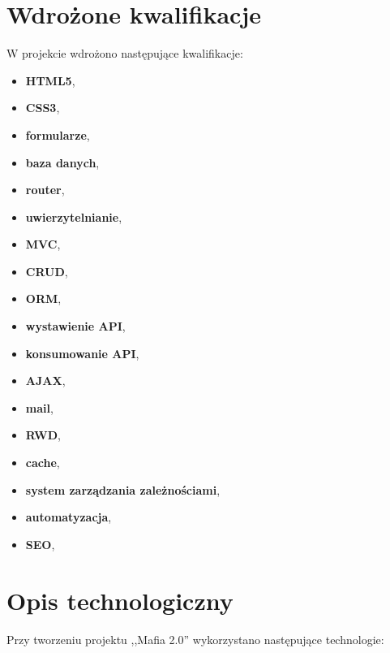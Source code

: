 \documentclass[12pt,a4paper]{article}
\begin{document}
	\section{Wdrożone kwalifikacje}	
		\indent W projekcie wdrożono następujące kwalifikacje:
		\begin{itemize}
			\item \textbf{HTML5},
			\item \textbf{CSS3},
			\item \textbf{formularze},
			\item \textbf{baza danych},
			\item \textbf{router},
			\item \textbf{uwierzytelnianie},
			\item \textbf{MVC},
			\item \textbf{CRUD},
			\item \textbf{ORM}, 
			\item \textbf{wystawienie API},
			\item \textbf{konsumowanie API},
			\item \textbf{AJAX}, 
			\item \textbf{mail},
			\item \textbf{RWD},
			\item \textbf{cache},
			\item \textbf{system zarządzania zależnościami}, 
			\item \textbf{automatyzacja},
			\item \textbf{SEO},
		\end{itemize}
		
	\newpage

	\section{Opis technologiczny}
		\indent Przy tworzeniu projektu ,,Mafia 2.0'' wykorzystano następujące technologie:
\end{document}
